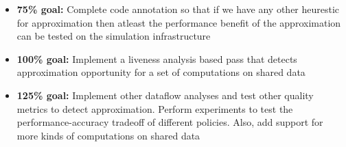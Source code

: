 \documentclass[12pt,conference]{IEEEtran}
\begin{document}
\begin{itemize}

\item \textbf{75\% goal:} Complete code annotation so that if we have any other heurestic
 for approximation then atleast the  performance benefit of the approximation can be tested on the simulation infrastructure
\item \textbf{100\% goal:} Implement a liveness analysis based pass that detects approximation opportunity for a set of computations on shared data
\item \textbf{125\% goal:} Implement other dataflow analyses and test other quality metrics to detect approximation. Perform experiments to test the performance-accuracy tradeoff of different policies. Also, add support for more kinds of computations on shared data

\end{itemize}





%
%

\end{document}
